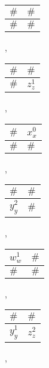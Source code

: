 \begin{example}
\begin{compactitem}
\begin{tabular}{|C{0.95cm}|C{0.95cm}|}
\hline
 \hspace{0.1cm}$\#$\hspace{0.1cm} & \hspace{0.1cm}$\#$\hspace{0.1cm} \tabularnewline
\hline
 $\#$ & $\#$ \tabularnewline
\hline
\end{tabular},
\begin{tabular}{|C{0.95cm}|C{0.95cm}|}
\hline
 \hspace{0.1cm}$\#$\hspace{0.1cm} & \hspace{0.1cm}$\#$\hspace{0.1cm} \tabularnewline
\hline
 $\#$ & $z_{z}^{1}$\tabularnewline
\hline
\end{tabular},
\begin{tabular}{|C{0.95cm}|C{0.95cm}|}
\hline
 $\#$ & $x_{x}^{0}$\tabularnewline
\hline
 \hspace{0.1cm}$\#$\hspace{0.1cm} & \hspace{0.1cm}$\#$\hspace{0.1cm} \tabularnewline
\hline
\end{tabular},
\begin{tabular}{|C{0.95cm}|C{0.95cm}|}
\hline
 \hspace{0.1cm}$\#$\hspace{0.1cm} & \hspace{0.1cm}$\#$\hspace{0.1cm} \tabularnewline
\hline
 $y_{y}^{2}$ & $\#$ \tabularnewline
\hline
\end{tabular},
\begin{tabular}{|C{0.95cm}|C{0.95cm}|}
\hline
 $w_w^1$ & $\#$ \tabularnewline
\hline
 \hspace{0.1cm}$\#$\hspace{0.1cm} & \hspace{0.1cm}$\#$\hspace{0.1cm} \tabularnewline
\hline
\end{tabular},
\begin{tabular}{|C{0.95cm}|C{0.95cm}|}
\hline
 \hspace{0.1cm}$\#$\hspace{0.1cm} & \hspace{0.1cm}$\#$\hspace{0.1cm} \tabularnewline
\hline
 $y_{y}^{1}$ & $z_{z}^{2}$\tabularnewline
\hline
\end{tabular},


\end{compactitem}
\end{example}
